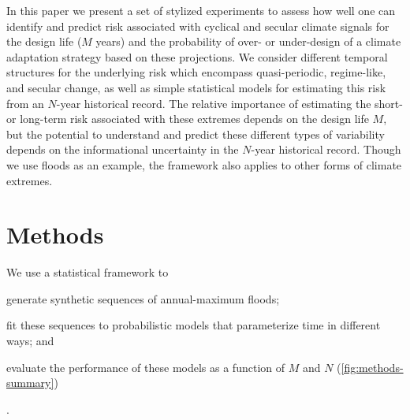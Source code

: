 \documentclass[
]{agujournal2018}
\begin{document}
In this paper we present a set of stylized experiments to assess how well one can identify and predict risk associated with cyclical and secular climate signals for the design life ($M$ years) and the probability of over- or under-design of a climate adaptation strategy based on these projections.
We consider different temporal structures for the underlying risk which encompass quasi-periodic, regime-like, and secular change, as well as simple statistical models for estimating this risk from an $N$-year historical record.
The relative importance of estimating the short- or long-term risk associated with these extremes depends on the design life $M$, but the potential to understand and predict these different types of variability depends on the informational uncertainty in the $N$-year historical record.
Though we use floods as an example, the framework also applies to other forms of climate extremes.


\section{Methods}\label{sec:methods}

We use a statistical framework to
\begin{enumerate*}[label= (\roman*)]
  \item generate synthetic sequences of annual-maximum floods;
  \item fit these sequences to probabilistic models that parameterize time in different ways; and
  \item evaluate the performance of these models as a function of $M$ and $N$ (\cref{fig:methods-summary})
\end{enumerate*}.
\end{document}
